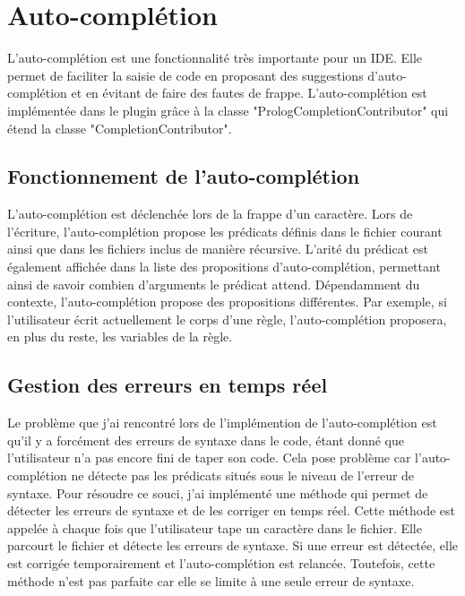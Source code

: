

\section{Auto-complétion}
\noindent L'auto-complétion est une fonctionnalité très importante pour un IDE. Elle permet de faciliter la saisie de code en proposant des suggestions d'auto-complétion et en évitant de faire des fautes de frappe.
\newdoubleline L'auto-complétion est implémentée dans le plugin grâce à la classe "PrologCompletionContributor" qui étend la classe "CompletionContributor".

\subsection{Fonctionnement de l'auto-complétion}
\noindent L'auto-complétion est déclenchée lors de la frappe d'un caractère. Lors de l'écriture, l'auto-complétion propose les prédicats définis dans le fichier courant ainsi que dans les fichiers inclus de manière récursive.
L'arité du prédicat est également affichée dans la liste des propositions d'auto-complétion, permettant ainsi de savoir combien d'arguments le prédicat attend.
\newdoubleline Dépendamment du contexte, l'auto-complétion propose des propositions différentes. Par exemple, si l'utilisateur écrit actuellement le corps d'une règle, l'auto-complétion proposera, en plus du reste, les variables de la règle.

\subsection{Gestion des erreurs en temps réel}
\noindent Le problème que j'ai rencontré lors de l'implémention de l'auto-complétion est qu'il y a forcément des erreurs
de syntaxe dans le code, étant donné que l'utilisateur n'a pas encore fini de taper son code. Cela pose problème car
l'auto-complétion ne détecte pas les prédicats situés sous le niveau de l'erreur de syntaxe.
\newdoubleline Pour résoudre ce souci,
j'ai implémenté une méthode qui permet de détecter les erreurs de syntaxe et de les corriger en temps réel.
Cette méthode est appelée à chaque fois que l'utilisateur tape un caractère dans le fichier. Elle parcourt le fichier et
détecte les erreurs de syntaxe. Si une erreur est détectée, elle est corrigée temporairement et l'auto-complétion est relancée.
\newdoubleline Toutefois, cette méthode n'est pas parfaite car elle se limite à une seule erreur de syntaxe.

